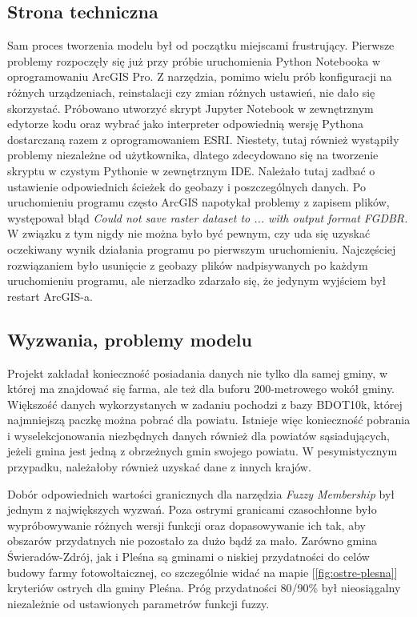 \documentclass{article}
\begin{document}
\subsection{Strona techniczna}
Sam proces tworzenia modelu był od początku miejscami frustrujący. Pierwsze problemy rozpoczęły się już przy próbie uruchomienia Python Notebooka w oprogramowaniu ArcGIS Pro. Z narzędzia, pomimo wielu prób konfiguracji na różnych urządzeniach, reinstalacji czy zmian różnych ustawień, nie dało się skorzystać.
Próbowano utworzyć skrypt Jupyter Notebook w zewnętrznym edytorze kodu oraz wybrać jako interpreter odpowiednią wersję Pythona dostarczaną razem z oprogramowaniem ESRI. Niestety, tutaj również wystąpiły problemy niezależne od użytkownika, dlatego zdecydowano się na tworzenie skryptu w czystym Pythonie w zewnętrznym IDE. Należało tutaj zadbać o ustawienie odpowiednich ścieżek do geobazy i poszczególnych danych.
\newline
Po uruchomieniu programu często ArcGIS napotykał problemy z zapisem plików, występował błąd \textit{Could not save raster dataset to ... with output format FGDBR.} W związku z tym nigdy nie można było być pewnym, czy uda się uzyskać oczekiwany wynik działania programu po pierwszym uruchomieniu. Najczęściej rozwiązaniem było usunięcie z geobazy plików nadpisywanych po każdym uruchomieniu programu, ale nierzadko zdarzało się, że jedynym wyjściem był restart ArcGIS-a.

\subsection{Wyzwania, problemy modelu}
Projekt zakładał konieczność posiadania danych nie tylko dla samej gminy, w której ma znajdować się farma, ale też dla buforu 200-metrowego wokół gminy. Większość danych wykorzystanych w zadaniu pochodzi z bazy BDOT10k, której najmniejszą paczkę można pobrać dla powiatu. Istnieje więc konieczność pobrania i wyselekcjonowania niezbędnych danych również dla powiatów sąsiadujących, jeżeli gmina jest jedną z obrzeżnych gmin swojego powiatu. W pesymistycznym przypadku, należałoby również uzyskać dane z innych krajów.

Dobór odpowiednich wartości granicznych dla narzędzia \textit{Fuzzy Membership} był jednym z największych wyzwań. Poza ostrymi granicami czasochłonne było wypróbowywanie różnych wersji funkcji oraz dopasowywanie ich tak, aby obszarów przydatnych nie pozostało za dużo bądź za mało. Zarówno gmina Świeradów-Zdrój, jak i Pleśna są gminami o niskiej przydatności do celów budowy farmy fotowoltaicznej, co szczególnie widać na mapie [\ref{fig:ostre-plesna}] kryteriów ostrych dla gminy Pleśna. Próg przydatności 80/90\% był nieosiągalny niezależnie od ustawionych parametrów funkcji fuzzy. 
\end{document}
